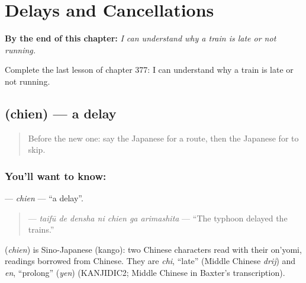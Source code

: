 
\chapter{Delays and Cancellations}
\label{ch:ja-delays-and-cancellations}

\begin{chapteropening}
\textbf{By the end of this chapter:} \emph{I can understand why a train is late or not running.}

Complete the last lesson of chapter 377: I can understand why a train is late or not running.
\end{chapteropening}

\section[\texorpdfstring{\ja{ちえん} (chien)}{ちえん (chien)}]{ (chien) — a delay}

\label{lesson:JA-C377-chien}



\begin{quote}
Before the new one: say the Japanese for a route, then the Japanese for to skip.
\end{quote}

\subsection*{You'll want to know: }
\textbf{} — \emph{chien} — \textquotedblleft{}a delay\textquotedblright{}.

\begin{quote}
\textbf{   } — \emph{taifū de densha ni chien ga arimashita} — \textquotedblleft{}The typhoon delayed the trains.\textquotedblright{}
\end{quote}

\begin{cousinweb}
\textbf{} (\emph{chien}) is Sino-Japanese (kango): two Chinese characters read with their on'yomi, readings borrowed from Chinese. They are \emph{chi}, \textquotedblleft{}late\textquotedblright{} (Middle Chinese \emph{drij}) and \emph{en}, \textquotedblleft{}prolong\textquotedblright{} (\emph{yen}) (KANJIDIC2; Middle Chinese in Baxter's transcription).
\end{cousinweb}

